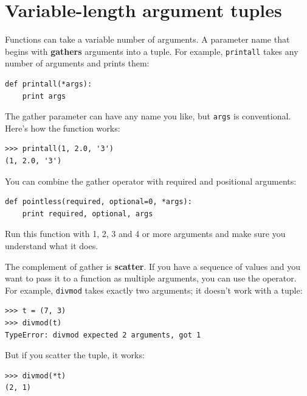 \documentclass[10pt]{book}
\begin{document}


\section{Variable-length argument tuples}


Functions can take a variable number of arguments.  A parameter
name that begins with {\tt *} {\bf gathers} arguments into
a tuple.  For example, {\tt printall}
takes any number of arguments and prints them:

\beforeverb
\begin{verbatim}
def printall(*args):
    print args
\end{verbatim}
\afterverb
%
The gather parameter can have any name you like, but {\tt args} is
conventional.  Here's how the function works:

\beforeverb
\begin{verbatim}
>>> printall(1, 2.0, '3')
(1, 2.0, '3')
\end{verbatim}
\afterverb
%
You can combine the gather operator with required and positional
arguments:

\beforeverb
\begin{verbatim}
def pointless(required, optional=0, *args):
    print required, optional, args
\end{verbatim}
\afterverb
%
Run this function with 1, 2, 3 and 4 or more arguments and
make sure you understand what it does.


The complement of gather is {\bf scatter}.  If you have a
sequence of values and you want to pass it to a function
as multiple arguments, you can use the {\tt *} operator.
For example, {\tt divmod} takes exactly two arguments; it
doesn't work with a tuple:


\beforeverb
\begin{verbatim}
>>> t = (7, 3)
>>> divmod(t)
TypeError: divmod expected 2 arguments, got 1
\end{verbatim}
\afterverb
%
But if you scatter the tuple, it works:

\beforeverb
\begin{verbatim}
>>> divmod(*t)
(2, 1)
\end{verbatim}
\afterverb
%
\end{document}
